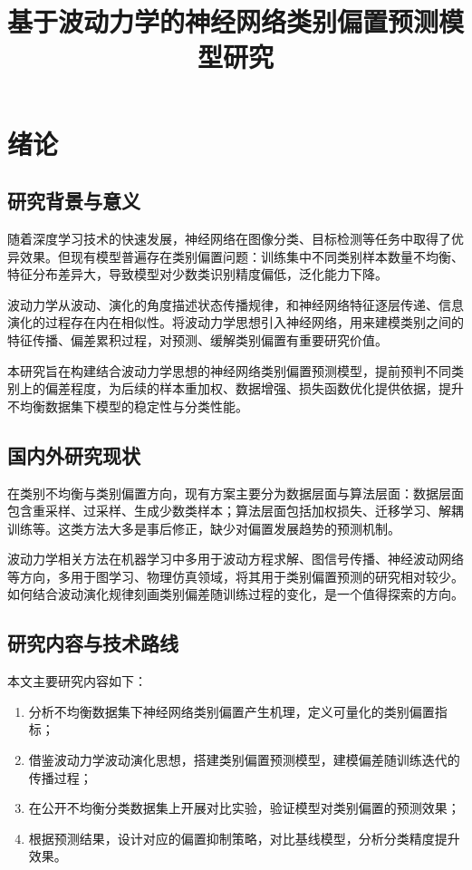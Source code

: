 \documentclass{article}
\title{基于波动力学的神经网络类别偏置预测模型研究}
\author{}
\date{}
\begin{document}
\maketitle

\section{绪论}
\subsection{研究背景与意义}
随着深度学习技术的快速发展，神经网络在图像分类、目标检测等任务中取得了优异效果。但现有模型普遍存在类别偏置问题：训练集中不同类别样本数量不均衡、特征分布差异大，导致模型对少数类识别精度偏低，泛化能力下降。

波动力学从波动、演化的角度描述状态传播规律，和神经网络特征逐层传递、信息演化的过程存在内在相似性。将波动力学思想引入神经网络，用来建模类别之间的特征传播、偏差累积过程，对预测、缓解类别偏置有重要研究价值。

本研究旨在构建结合波动力学思想的神经网络类别偏置预测模型，提前预判不同类别上的偏差程度，为后续的样本重加权、数据增强、损失函数优化提供依据，提升不均衡数据集下模型的稳定性与分类性能。

\subsection{国内外研究现状}
在类别不均衡与类别偏置方向，现有方案主要分为数据层面与算法层面：数据层面包含重采样、过采样、生成少数类样本；算法层面包括加权损失、迁移学习、解耦训练等。这类方法大多是事后修正，缺少对偏置发展趋势的预测机制。

波动力学相关方法在机器学习中多用于波动方程求解、图信号传播、神经波动网络等方向，多用于图学习、物理仿真领域，将其用于类别偏置预测的研究相对较少。如何结合波动演化规律刻画类别偏差随训练过程的变化，是一个值得探索的方向。

\subsection{研究内容与技术路线}
本文主要研究内容如下：
\begin{enumerate}
    \item 分析不均衡数据集下神经网络类别偏置产生机理，定义可量化的类别偏置指标；
    \item 借鉴波动力学波动演化思想，搭建类别偏置预测模型，建模偏差随训练迭代的传播过程；
    \item 在公开不均衡分类数据集上开展对比实验，验证模型对类别偏置的预测效果；
    \item 根据预测结果，设计对应的偏置抑制策略，对比基线模型，分析分类精度提升效果。
\end{enumerate}
\end{document}
